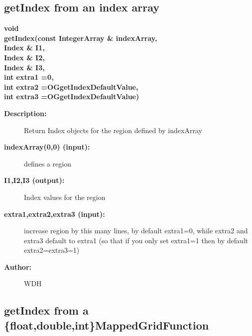 \subsection{getIndex from an index array}
 
\newlength{\OGgetIndexIncludeArgIndent}
\begin{flushleft} \textbf{%
void  \\ 
\settowidth{\OGgetIndexIncludeArgIndent}{getIndex(}%
getIndex(const IntegerArray \& indexArray, \\ 
\hspace{\OGgetIndexIncludeArgIndent}Index \& I1, \\ 
\hspace{\OGgetIndexIncludeArgIndent}Index \& I2, \\ 
\hspace{\OGgetIndexIncludeArgIndent}Index \& I3, \\ 
\hspace{\OGgetIndexIncludeArgIndent}int extra1 =0,\\ 
\hspace{\OGgetIndexIncludeArgIndent}int extra2 =OGgetIndexDefaultValue,\\ 
\hspace{\OGgetIndexIncludeArgIndent}int extra3   =OGgetIndexDefaultValue)
}\end{flushleft}
\begin{description}
\item[{\bf Description:}] 
   Return Index objects for the region defined by indexArray

\item[{\bf indexArray(0,0) (input):}]  defines a region
\item[{\bf I1,I2,I3 (output):}]  Index values for the region
\item[{\bf extra1,extra2,extra3 (input):}]  increase region by this many lines, by default extra1=0, while 
                         extra2 and extra3 default to extra1 (so that if you only set extra1=1
                         then by default extra2=extra3=1)
\item[{\bf Author:}]  WDH
\end{description}
\subsection{getIndex from a \{float,double,int\}MappedGridFunction}
 
